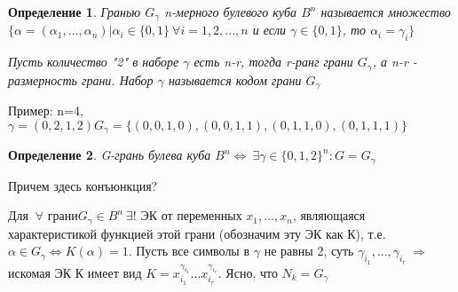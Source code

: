 \documentclass[draft]{report}
\newtheorem*  {opred}  {Определение}
\theoremstyle {remark}
\theoremstyle {remark}
\begin{document}
\begin{opred}
Гранью $G_\gamma$ n-мерного булевого куба $B^n$ называется множество $\{\alpha=(\alpha_1,...,\alpha_n)|\alpha_i \in \{0,1\} \ \forall i=1,2,...,n$ и если $\gamma \in \{0,1\}$, то $\alpha_i=\gamma_i\}$

Пусть количество "2" в наборе $\gamma$ есть n-r, тогда r-ранг грани $G_\gamma$, а n-r - размерность грани. Набор $\gamma$ называется кодом грани $G_\gamma$
\end{opred}

Пример: n=4, $\gamma=(0,2,1,2) G_\gamma = \{(0,0,1,0),(0,0,1,1),(0,1,1,0),(0,1,1,1)\}$

\begin{opred}
G-грань булева куба $B^n \Leftrightarrow \ \exists \gamma \in \{0,1,2\}^n:G=G_\gamma$
\end{opred}
Причем здесь конъюнкция?

Для $\ \forall$ грани$G_\gamma \in B^n \ \exists!$ ЭК от переменных $x_1,...,x_n$, являющаяся характеристикой функцией этой грани (обозначим эту ЭК как К), т.е. $\alpha \in G_\gamma \Leftrightarrow K(\alpha)=1$. Пусть все символы в $\gamma$ не равны 2, суть $\gamma_{i_1},...,\gamma_{i_r} \ \Rightarrow\ $ искомая ЭК К имеет вид $K=x_{i_1}^{\gamma_{i_1}}...x_{i_r}^{\gamma_{i_r}}$. Ясно, что $N_k=G_\gamma$
\end{document}
